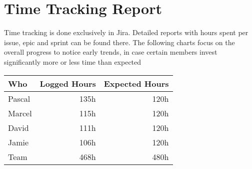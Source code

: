 \chapter{Time Tracking Report}

Time tracking is done exclusively in Jira.
Detailed reports with hours spent per issue, epic and sprint can be found there.
The following charts focus on the overall progress to notice early trends, in case certain members invest significantly more or less time than expected


\begin{table}[H]
    \begin{tabular}{l|r|r}
        \textbf{Who} & \textbf{Logged Hours} & \textbf{Expected Hours} \\
        \hline
        Pascal & 135h & 120h \\
        Marcel & 115h & 120h \\
        David  & 111h & 120h \\
        Jamie  & 106h & 120h \\
        \hline
        Team   & 468h & 480h
    \end{tabular}
\end{table}
